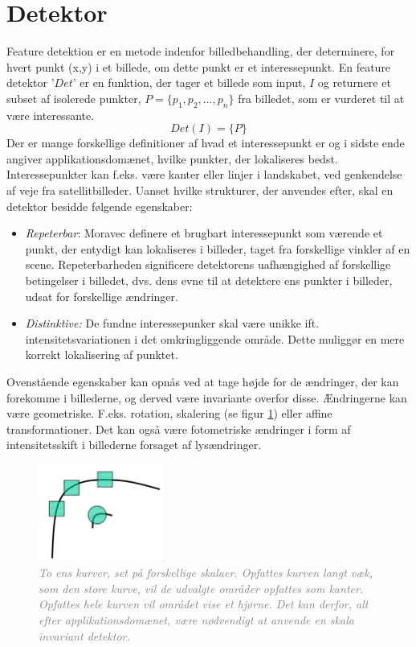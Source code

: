 \section{Detektor}\label{sec:detect}
Feature detektion er en metode indenfor billedbehandling, der determinere, for hvert punkt (x,y) i et billede, om dette punkt er et interessepunkt.  En feature detektor '$Det$' er en funktion, der tager et billede som input, $I$ og returnere et subset af isolerede punkter, $P= \lbrace p_1,p_2,...,p_n\rbrace$ fra billedet, som er vurderet til at være interessante. 
$$ Det(I)=\lbrace P \rbrace$$
Der er mange forskellige definitioner af hvad et interessepunkt er og i sidste ende angiver applikationsdomænet, hvilke punkter, der lokaliseres bedst. Interessepunkter kan f.eks. være kanter eller linjer i landskabet, ved genkendelse af veje fra satellitbilleder. Uanset hvilke strukturer, der anvendes efter, skal en detektor besidde følgende egenskaber:
\begin{itemize}
\item{\emph{Repeterbar}: Moravec \cite{moravec} definere et brugbart interessepunkt som værende et punkt, der entydigt kan lokaliseres i billeder, taget fra forskellige vinkler af en scene. Repeterbarheden significere detektorens uafhængighed af forskellige betingelser i billedet, dvs. dens evne til at detektere ens punkter i billeder, udsat for forskellige ændringer. }
\item{\emph{Distinktive:}
De fundne interessepunker skal være unikke ift. intensitetsvariationen i det omkringliggende område. Dette muliggør en mere korrekt lokalisering af punktet.}
\end{itemize}
Ovenstående egenskaber kan opnås ved at tage højde for de ændringer, der kan forekomme i billederne, og derved være invariante overfor disse. Ændringerne kan være geometriske. F.eks. rotation, skalering (se figur \ref{fig:skal}) eller affine transformationer. Det kan også være fotometriske ændringer i form af intensitetsskift i billederne forsaget af lysændringer.
\begin{figure}[H]
    \centering
    \includegraphics[width=0.37\textwidth]{fig/28.png}
     \vspace{-1em}
    \begin{center}    
       \caption{\textcolor{gray}{\footnotesize \textit{To ens kurver, set på forskellige skalaer. Opfattes kurven langt væk, som den store kurve, vil de udvalgte områder opfattes som kanter. Opfattes hele kurven vil området vise et hjørne. Det kan derfor, alt efter applikationsdomænet, være nødvendigt at anvende en skala invariant detektor.}}}
    \label{fig:skal}
     \end{center}
     \vspace{-2.5em}
  \end{figure} \noindent
